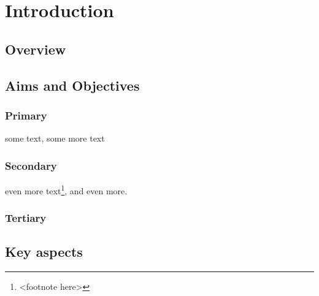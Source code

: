 \chapter{Introduction}

\section{Overview}

\section{Aims and Objectives}
\subsection{Primary}

some text\cite{citation-1-name-here}, some more text
\subsection{Secondary}

even more text\footnote{<footnote here>}, and even more.
\subsection{Tertiary}

\section{Key aspects}